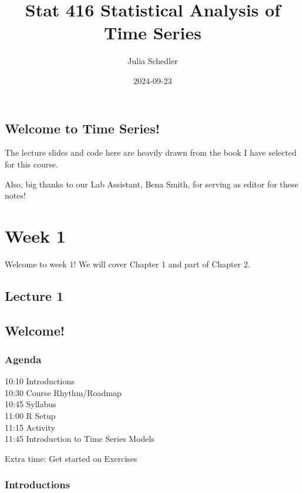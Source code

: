\documentclass[
  letterpaper,
  DIV=11,
  numbers=noendperiod]{scrreprt}
\title{Stat 416 Statistical Analysis of Time Series}
\author{Julia Schedler}
\date{2024-09-23}
\renewcommand*\contentsname{Table of contents}
\newcommand\contentsname{Table of contents}
\begin{document}
\maketitle

\renewcommand*\contentsname{Table of contents}
{
\hypersetup{linkcolor=}
\setcounter{tocdepth}{2}
\tableofcontents
}

\chapter*{Welcome to Time Series!}\label{welcome-to-time-series}


The lecture slides and code here are heavily drawn from the book I have
selected for this course.

Also, big thanks to our Lab Assistant, Bena Smith, for serving as editor
for these notes!

\part{Week 1}

Welcome to week 1! We will cover Chapter 1 and part of Chapter 2.

\chapter{Lecture 1}\label{lecture-1}

\chapter{Welcome!}\label{welcome}

\section{Agenda}\label{agenda}

10:10 Introductions\\
10:30 Course Rhythm/Roadmap\\
10:45 Syllabus\\
11:00 R Setup\\
11:15 Activity\\
11:45 Introduction to Time Series Models

Extra time: Get started on Exercises

\section{Introductions}\label{introductions}
\end{document}
